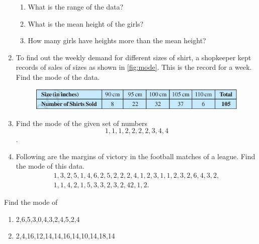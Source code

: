 \begin{enumerate}[label=\thesection.\arabic*, ref=\thesection.\theenumi]
\begin{enumerate}
		\item What is the range of the data?
		\item What is the mean height of the girls?
		\item How many girls have heights more than the mean height?
	\end{enumerate}
\item To find out the weekly demand for different sizes of shirt, a shopkeeper kept records of sales of sizes as shown in 
  \eqref{fig:mode}.  This is the record for a week.  Find the mode of the data.
	\begin{figure}[H]
  \centering
  \includegraphics[width=\columnwidth]{figs/mode.jpg}
  \caption{}
  \label{fig:mode}
\end{figure}
\item Find the mode of the given set of numbers
	$$1,1,1,2,2,2,2,3,4,4$$.
\item Following are the margins of victory in the football matches of a league.  Find the mode of this data.
	\begin{gather*}
	1,3,2,5,1,4,6,2,5,2,2,2,4,1,2,3,1,1,2,3,2,6,4,3,2,
	\\
	1,1,4,2,1,5,3,3,2,3,2,42,1,2.
	\end{gather*}
\end{enumerate}
Find the mode of
\begin{enumerate}[label=\thesection.\arabic*, ref=\thesection.\theenumi]
\item 	
		2,6,5,3,0,4,3,2,4,5,2,4
\item 
		2,4,16,12,14,14,16,14,10,14,18,14
\end{enumerate}
